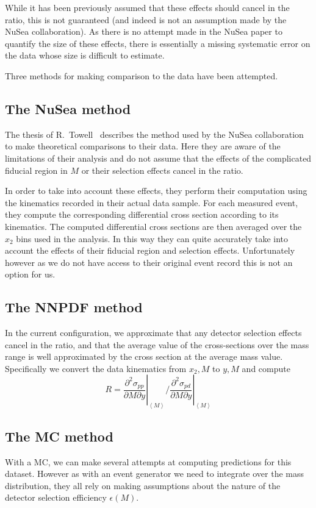 \documentclass[11pt]{article}
\newcommand{\be}{\begin{equation}}
\newcommand{\ee}{\end{equation}}
\begin{document}
While it has been previously assumed that these effects should cancel in the ratio, this is not guaranteed (and indeed is
not an assumption made by the NuSea collaboration). As there is no attempt made in the NuSea paper to quantify the size of these effects, 
there is essentially a missing systematic error on the data whose size is difficult to estimate.

Three methods for making comparison to the data have been attempted.
\subsection{The NuSea method}
The thesis of R.~Towell~\cite{Towell:2001dz} describes the method used by the NuSea collaboration
to make theoretical comparisons to their data. Here they are aware of the limitations of their analysis and do not assume
that the effects of the complicated fiducial region in $M$ or their selection effects cancel in the ratio.

In order to take into account these effects, they perform their computation using the kinematics recorded in their
actual data sample. For each measured event, they compute the corresponding differential cross section according
to its kinematics. The computed differential cross sections are then averaged over the $x_2$ bins used in the analysis.
In this way they can quite accurately take into account the effects of their fiducial region and selection effects. Unfortunately
however as we do not have access to their original event record this is not an option for us.

\subsection{The NNPDF method}
In the current configuration, we approximate that any detector selection effects cancel in the ratio, and
that the average value of the cross-sections over the mass range is well approximated by the cross section at
the average mass value. Specifically we convert the data kinematics from $x_2, M$ to $y, M$ and compute
\be R = \left.\frac{\partial^2\sigma_{pp}}{\partial M \partial y}\right|_{\left<M\right>} \bigg/ \left.\frac{\partial^2\sigma_{pd}}{\partial M \partial y}\right|_{\left<M\right>} \ee

\subsection{The MC method}
With a MC, we can make several attempts at computing predictions for this dataset. However as with an event
generator we need to integrate over the mass distribution, they all rely on making assumptions about the nature 
of the detector selection efficiency $\epsilon(M)$. 
\end{document}
